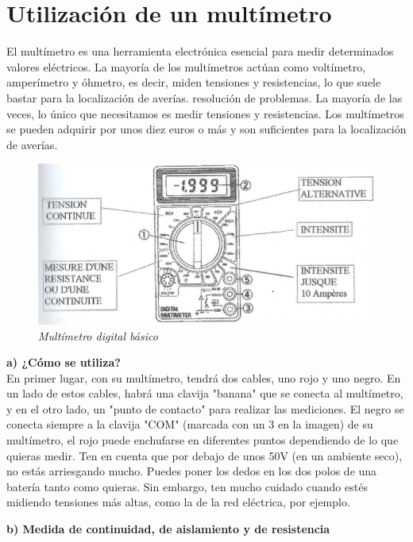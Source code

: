 \documentclass[a5paper,twoside,openany]{book}
\begin{document}
\section{Utilización de un multímetro}
El multímetro es una herramienta electrónica esencial para medir
determinados valores eléctricos. La mayoría de los multímetros actúan como
voltímetro, amperímetro y óhmetro, es decir, miden tensiones
y resistencias, lo que suele bastar para la localización de averías.
resolución de problemas. La mayoría de las veces, lo único que necesitamos es medir tensiones y resistencias. Los multímetros se pueden adquirir por unos diez euros o más y son suficientes para la localización de averías.

\begin{figure}[h]
\includegraphics[width=\textwidth]{multimetro-digital} 
\centering
\caption*{\textit{Multímetro digital básico}}
\end{figure}
\textbf{a) ¿Cómo se utiliza?}\\

En primer lugar, con su multímetro, tendrá dos cables, uno rojo y uno negro. En un lado de estos cables, habrá una clavija "banana" que se conecta al multímetro, y en el otro lado, un "punto de contacto" para realizar las mediciones.
El negro se conecta siempre a la clavija "COM" (marcada con un 3 en la imagen) de su multímetro, el rojo puede enchufarse en diferentes puntos dependiendo de lo que quieras medir.
Ten en cuenta que por debajo de unos 50V (en un ambiente seco), no estás arriesgando mucho.
Puedes poner los dedos en los dos polos de una batería tanto como quieras. Sin embargo, ten mucho cuidado cuando estés midiendo tensiones más altas, como la de la red eléctrica, por ejemplo.

\newpage

\textbf{b) Medida de continuidad, de aislamiento y de resistencia}\\
\end{document}
